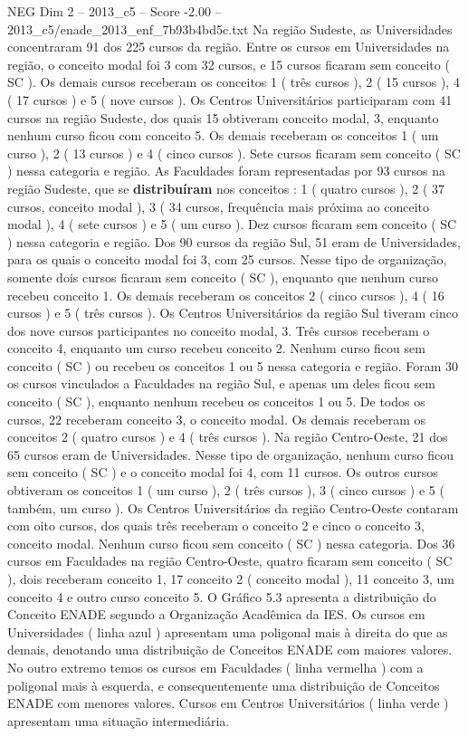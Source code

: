 \begin{textsample}{NEG Dim 2 – 2013\_c5 – Score -2.00 – 2013\_c5/enade\_2013\_enf\_7b93b4bd5c.txt}
Na região Sudeste, as Universidades concentraram 91 dos 225 cursos da região.
Entre os cursos em Universidades na região, o conceito modal foi 3 com 32 cursos, e 15 cursos ficaram sem conceito ( SC ).
Os demais cursos receberam os conceitos 1 ( três cursos ), 2 ( 15 cursos ), 4 ( 17 cursos ) e 5 ( nove cursos ).
Os Centros Universitários participaram com 41 cursos na região Sudeste, dos quais 15 obtiveram conceito modal, 3, enquanto nenhum curso ficou com conceito 5.
Os demais receberam os conceitos 1 ( um curso ), 2 ( 13 cursos ) e 4 ( cinco cursos ).
Sete cursos ficaram sem conceito ( SC ) nessa categoria e região.
As Faculdades foram representadas por 93 cursos na região Sudeste, que se \textbf{distribuíram} nos conceitos : 1 ( quatro cursos ), 2 ( 37 cursos, conceito modal ), 3 ( 34 cursos, frequência mais próxima ao conceito modal ), 4 ( sete cursos ) e 5 ( um curso ).
Dez cursos ficaram sem conceito ( SC ) nessa categoria e região.
Dos 90 cursos da região Sul, 51 eram de Universidades, para os quais o conceito modal foi 3, com 25 cursos.
Nesse tipo de organização, somente dois cursos ficaram sem conceito ( SC ), enquanto que nenhum curso recebeu conceito 1.
Os demais receberam os conceitos 2 ( cinco cursos ), 4 ( 16 cursos ) e 5 ( três cursos ).
Os Centros Universitários da região Sul tiveram cinco dos nove cursos participantes no conceito modal, 3.
Três cursos receberam o conceito 4, enquanto um curso recebeu conceito 2.
Nenhum curso ficou sem conceito ( SC ) ou recebeu os conceitos 1 ou 5 nessa categoria e região.
Foram 30 os cursos vinculados a Faculdades na região Sul, e apenas um deles ficou sem conceito ( SC ), enquanto nenhum recebeu os conceitos 1 ou 5.
De todos os cursos, 22 receberam conceito 3, o conceito modal.
Os demais receberam os conceitos 2 ( quatro cursos ) e 4 ( três cursos ).
Na região Centro-Oeste, 21 dos 65 cursos eram de Universidades.
Nesse tipo de organização, nenhum curso ficou sem conceito ( SC ) e o conceito modal foi 4, com 11 cursos.
Os outros cursos obtiveram os conceitos 1 ( um curso ), 2 ( três cursos ), 3 ( cinco cursos ) e 5 ( também, um curso ).
Os Centros Universitários da região Centro-Oeste contaram com oito cursos, dos quais três receberam o conceito 2 e cinco o conceito 3, conceito modal.
Nenhum curso ficou sem conceito ( SC ) nessa categoria.
Dos 36 cursos em Faculdades na região Centro-Oeste, quatro ficaram sem conceito ( SC ), dois receberam conceito 1, 17 conceito 2 ( conceito modal ), 11 conceito 3, um conceito 4 e outro curso conceito 5.
O Gráfico 5.3 apresenta a distribuição do Conceito ENADE segundo a Organização Acadêmica da IES.
Os cursos em Universidades ( linha azul ) apresentam uma poligonal mais à direita do que as demais, denotando uma distribuição de Conceitos ENADE com maiores valores.
No outro extremo temos os cursos em Faculdades ( linha vermelha ) com a poligonal mais à esquerda, e consequentemente uma distribuição de Conceitos ENADE com menores valores.
Cursos em Centros Universitários ( linha verde ) apresentam uma situação intermediária.

\end{textsample}
